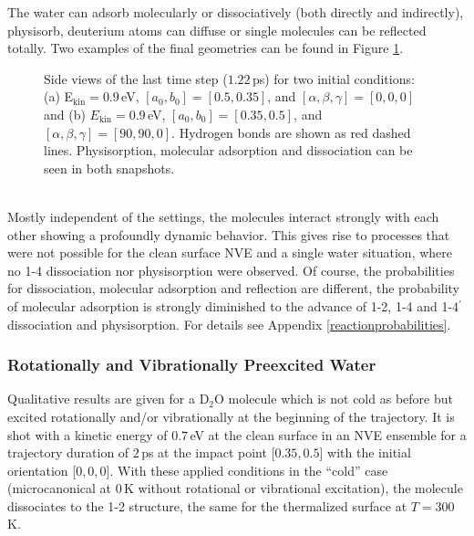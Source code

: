 \documentclass[11pt,DIV=13,BCOR=5mm,a4paper,headinclude]{scrbook}
\begin{document}
The water can adsorb molecularly or dissociatively (both directly and indirectly), physisorb, deuterium atoms can diffuse or single molecules can be reflected totally.
Two examples of the final geometries can be found in Figure \ref{abb:tetramer_traj}.
\begin{figure}[!ht]
\centering
{} 
\quad
{}
\caption{Side views of the last time step ($1.22\,$ps) for two initial conditions: (a) E$_\textrm{kin}=0.9\,$eV, $[a_0,b_0]=[0.5,0.35]$, and $[\alpha,\beta,\gamma]=[0,0,0]$ and (b)  $E_\textrm{kin}=0.9\,$eV, $[a_0,b_0]=[0.35,0.5]$, 
 and $[\alpha,\beta,\gamma]=[90,90,0]$.
Hydrogen bonds are shown as red dashed lines.
Physisorption, molecular adsorption and dissociation can be seen in both snapshots.}
\label{abb:tetramer_traj}
\end{figure}
\\

Mostly independent of the settings, the molecules interact strongly with each other showing a profoundly dynamic behavior.
This gives rise to processes that were not possible for the clean surface NVE and a single water situation, where no 1-4 dissociation nor physisorption were observed.
Of course, the probabilities for dissociation, molecular adsorption and reflection are different, the probability of molecular adsorption is strongly diminished to the advance of 1-2, 1-4 and 1-4$^\prime$ dissociation and physisorption.
For details see Appendix \ref{reactionprobabilities}.

\subsubsection{Rotationally and Vibrationally Preexcited Water}\label{preex}
Qualitative results are given for a D$_2$O molecule which is not cold as before but excited rotationally and/or vibrationally at the beginning of the trajectory.
It is shot with a kinetic energy of $0.7\,$eV at the clean surface in an NVE ensemble for a trajectory duration of $2\,$ps at the impact point [$0.35,0.5$] with the initial orientation [$0,0,0$].
With these applied conditions in the ``cold'' case (microcanonical at $0\,$K without rotational or vibrational excitation), the molecule dissociates to the 1-2 structure, the same for the thermalized surface at $T=300\,$K.
\end{document}
